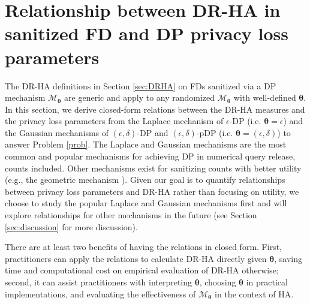 \documentclass[10pt,journal,compsoc]{IEEEtran}
\newcommand{\M}{\mathcal{M}}
\newcommand{\bs}{\boldsymbol}
\begin{document}
\vspace{-6pt}\section{Relationship between DR-HA in sanitized FD and DP privacy loss parameters}\label{sec:relation}\vspace{-3pt}
The DR-HA definitions in Section \ref{sec:DRHA}  on FDs sanitized via a DP mechanism $\M_{\bs\theta}$ are generic and apply to any randomized $\M_{\bs\theta}$ with well-defined  $\bs\theta$. In this section, we derive closed-form relations between the DR-HA measures and the privacy loss parameters from the Laplace mechanism of $\epsilon$-DP (i.e. $\bs\theta\!=\!\epsilon$) and the Gaussian mechanisms of $(\epsilon,\delta)$-DP and $(\epsilon,\delta)$-pDP  (i.e. $\bs\theta\!=\!(\epsilon,\delta)$) to answer  Problem \ref{prob}.  The Laplace and Gaussian mechanisms are the most common and popular mechanisms for achieving DP in numerical query release, counts included. Other mechanisms exist for sanitizing counts with better utility (e.g., the geometric mechanism \cite{ghosh2009universally}). Given our goal is to quantify relationships between privacy loss parameters and DR-HA rather than focusing on utility, we choose to  study the popular Laplace and Gaussian mechanisms first and will explore relationships for other mechanisms in the future (see Section \ref{sec:discussion} for more discussion).

There are at least two benefits of having the relations in closed form. First, practitioners can apply the relations  to calculate DR-HA directly given $\bs\theta$, saving time and computational cost  on empirical evaluation of DR-HA otherwise; second, it can assist practitioners with interpreting  $\bs\theta$, choosing $\bs\theta$ in practical implementations, and evaluating the effectiveness of $\M_{\bs\theta}$ in the context of HA.  
\end{document}
